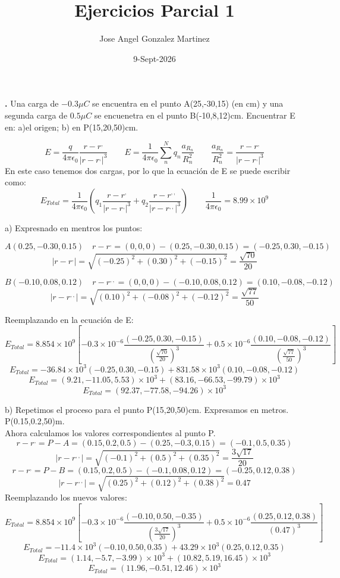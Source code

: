 \documentclass{article}
\title{Ejercicios Parcial 1}
\author{Jose Angel Gonzalez Martinez}
\date{9-Sept-2026}
\newcounter{ejercicio}
\renewcommand{\theejercicio}{\arabic{ejercicio}}
\begin{document}
\RaggedRight
\justifying
\maketitle


\noindent \textbf{\theejercicio.} Una carga de $-0.3\mu C$ se encuentra en el punto 
A(25,-30,15) (en cm) y una segunda carga de $0.5\mu C$ se encuenetra en el 
punto B(-10,8,12)cm. Encuentrar E en: a)el origen; b) en P(15,20,50)cm.

\[E=\frac{q}{4 \pi \epsilon_0} \frac{r-r^,}{|r-r^,|^3} \qquad E=\frac{1}{4 \pi \epsilon_0} \sum_{n}^{N} 
q_n \frac{a_{R_n}}{R_n^2} \qquad \frac{a_{R_n}}{R_n^2}=\frac{r-r^,}{|r-r^,|^3} \]
En este caso tenemos dos cargas, por lo que la ecuación de E se puede escribir como:
\[E_{Total}=\frac{1}{4 \pi \epsilon_0} \left( q_1 \frac{r-r^,}{|r-r^,|^3} + q_2 \frac{r-r^{,,}}{|r-r^{,,}|^3} \right) \qquad \frac{1}{4 \pi \epsilon_0}=8.99 \times 10^9 \]
 

\noindent a) Expresnado en mentros los puntos:

\[A(0.25, -0.30, 0.15) \quad r-r^, = (0,0,0)-(0.25, -0.30, 0.15)=(-0.25, 0.30, -0.15)\]
\[ |r-r^,| = \sqrt{(-0.25)^2 + (0.30)^2 + (-0.15)^2} = \frac{\sqrt{70}}{20}\]

\[B(-0.10, 0.08, 0.12) \quad r-r^{,,} = (0,0,0)-(-0.10, 0.08, 0.12)=(0.10, -0.08, -0.12)\]
\[ |r-r^{,,}| = \sqrt{(0.10)^2 + (-0.08)^2 + (-0.12)^2} = \frac{\sqrt{77}}{50}\]

\noindent Reemplazando en la ecuación de E:
\[E_{Total}=8.854 \times 10^9 \left[ -0.3 \times 10^{-6} \frac{(-0.25, 0.30, -0.15)}{(\frac{\sqrt{70}}{20 })^3} + 0.5 \times 10^{-6} \frac{(0.10, -0.08, -0.12)}{(\frac{\sqrt{77}}{50})^3} \right] \]
\[E_{Total}=-36.84 \times 10^3 (-0.25, 0.30, -0.15)+831.58 \times 10^3 (0.10, -0.08, -0.12)\]
\[E_{Total}=(9.21, -11.05, 5.53) \times 10^3 + (83.16, -66.53,-99.79) \times 10^3 \]
\[E_{Total}=(92.37, -77.58, -94.26) \times 10^3 \]
\vspace{0.5cm}

\noindent b) Repetimos el proceso para el punto P(15,20,50)cm.
Expresamos en metros.
P(0.15,0.2,50)m.
\\
Ahora calculamos los valores correspondientes al punto P.
\\
\[r-r^,=P-A=(0.15,0.2,0.5)-(0.25,-0.3,0.15)=(-0.1,0.5,0.35)\]
\[|r-r^{,,}|=\sqrt{(-0.1)^2+(0.5)^2+(0.35)^2}=\frac{3\sqrt{17}}{20}\]
\[r-r^,=P-B=(0.15,0.2,0.5)-(-0.1,0.08,0.12)=(-0.25,0.12,0.38)\]
\[|r-r^{,,}|=\sqrt{(0.25)^2+(0.12)^2+(0.38)^2}=0.47\]
Reemplazando los nuevos valores:
\[E_{Total}=8.854 \times 10^9 \left[ -0.3 \times 10^{-6} \frac{(-0.10, 0.50, -0.35)}{(\frac{3\sqrt{17}}{20 })^3} + 0.5 \times 10^{-6} \frac{(0.25, 0.12, 0.38)}{(0.47)^3} \right] \]
\[E_{Total}=-11.4 \times 10^3 (-0.10,0.50, 0.35)+43.29 \times 10^3 (0.25, 0.12, 0.35)\]
\[E_{Total}=(1.14, -5.7, -3.99) \times 10^3 + (10.82, 5.19,16.45) \times 10^3 \]
\[E_{Total}=(11.96, -0.51, 12.46) \times 10^3 \]
\vspace{0.5cm}
\end{document}
